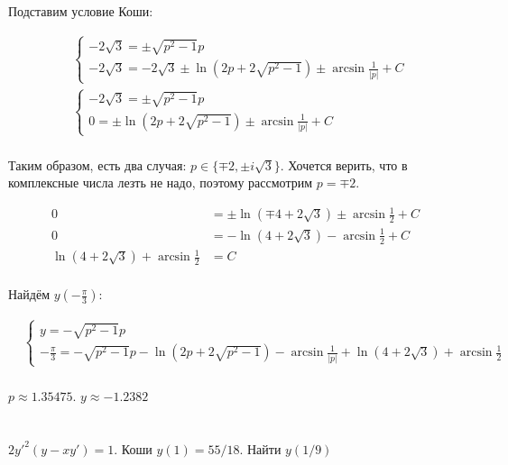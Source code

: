 Подставим условие Коши:

\begin{align*}
     & \begin{cases}
        -2 \sqrt{3} = \pm \sqrt{p^2 - 1}p \\
        -2 \sqrt{3} = -2 \sqrt{3} \pm \ln(2p + 2 \sqrt{p^2 - 1}) \pm \arcsin \frac{1}{|p|} + C
    \end{cases} \\
     & \begin{cases}
        -2 \sqrt{3} = \pm \sqrt{p^2 - 1}p \\
        0 = \pm \ln(2p + 2 \sqrt{p^2 - 1}) \pm \arcsin \frac{1}{|p|} + C
    \end{cases} \\
\end{align*}

Таким образом, есть два случая: \( p\in \{ \mp 2, \pm i\sqrt{3} \}\). Хочется верить, что в комплексные числа лезть не надо, поэтому рассмотрим \(p = \mp 2\).

\begin{align*}
    0                                         & = \pm \ln( \mp 4 + 2 \sqrt{3}) \pm \arcsin \frac{1}{2} + C \\
    0                                         & = - \ln(4 + 2 \sqrt{3}) - \arcsin \frac{1}{2}          + C \\
    \ln(4 + 2 \sqrt{3}) + \arcsin \frac{1}{2} & = C                                                        \\
\end{align*}

Найдём \(y( -\frac{\pi}{3})\):

\begin{align*}
     & \begin{cases}
        y = -\sqrt{p^2 - 1}p \\
        -\frac{\pi}{3} = -\sqrt{p^2 - 1}p - \ln(2p + 2 \sqrt{p^2 - 1}) - \arcsin \frac{1}{|p|} + \ln(4 + 2 \sqrt{3}) + \arcsin \frac{1}{2}
    \end{cases} \\
\end{align*}

\(p\approx 1.35475\). \(y \approx -1.2382\)

\section{}

$2y'^2(y-xy')=1$. Коши $y(1)=55/18$. Найти $y(1/9)$


